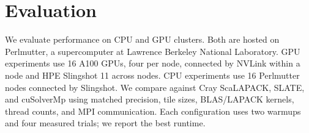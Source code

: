 \documentclass[sigplan, nonacm]{acmart}
\begin{document}
\section{Evaluation}
\label{sec:eval}
We evaluate performance on CPU and GPU clusters. Both are hosted on Perlmutter, a supercomputer at Lawrence Berkeley National Laboratory. GPU experiments use 16 A100 GPUs, four per node, connected by NVLink within a node and HPE Slingshot 11 across nodes. CPU experiments use 16 Perlmutter nodes connected by Slingshot. 
We compare against Cray ScaLAPACK, SLATE, and cuSolverMp using matched precision, tile sizes, BLAS/LAPACK kernels, thread counts, and MPI communication. Each configuration uses two warmups and four measured trials; we report the best runtime.
\end{document}
